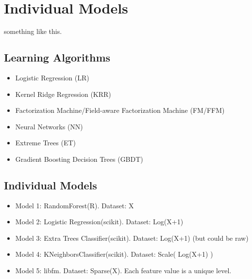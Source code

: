 \section{Individual Models}
something like this.

\subsection{Learning Algorithms}
\begin{itemize}
\setlength\itemsep{0em}
\item Logistic Regression (LR)
\item Kernel Ridge Regression (KRR)
\item Factorization Machine/Field-aware Factorization Machine (FM/FFM)
\item Neural Networks (NN)
\item Extreme Trees (ET)
\item Gradient Boosting Decision Trees (GBDT)
\end{itemize}

\subsection{Individual Models}
\begin{itemize}
  \setlength\itemsep{0em}
  \item Model 1: RandomForest(R). Dataset: X
  \item Model 2: Logistic Regression(scikit). Dataset: Log(X+1)
  \item Model 3: Extra Trees Classifier(scikit). Dataset: Log(X+1) (but could be raw)
  \item Model 4: KNeighborsClassifier(scikit). Dataset: Scale( Log(X+1) )
  \item Model 5: libfm. Dataset: Sparse(X). Each feature value is a unique level.
\end{itemize}
